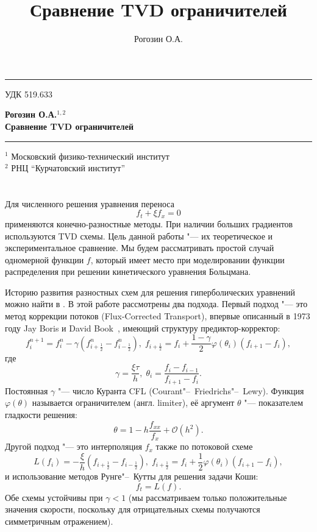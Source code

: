 \documentclass[a4paper,10pt]{article}
\title{Сравнение TVD ограничителей}
\author{Рогозин О.А.}
\date{}
\begin{document}
\begin{center}
	\rule{\linewidth}{0.5mm}
\end{center}
УДК 519.633
\begin{center}
	\large\bfseries Рогозин О.А.\({}^{1,2}\) \\[3mm]
	\huge\bfseries Сравнение TVD ограничителей \\
	\rule{\linewidth}{0.5mm}
\end{center}
	\({}^1\) Московский физико-технический институт \\
	\({}^2\) РНЦ ``Курчатовский институт'' \\

\section*{}
Для численного решения уравнения переноса \[f_t+\xi f_x=0 \] применяются конечно-разностные методы.
При наличии больших градиентов используются TVD схемы. Цель данной работы "--- их теоретическое и экспериментальное сравнение.
Мы будем рассматривать простой случай одномерной функции \(f\), который имеет место при моделировании функции распределения
при решении кинетического уравнения Больцмана.

Историю развития разностных схем для решения гиперболических уравнений можно найти в \cite{vanLeer2006}. В этой работе рассмотрены два подхода.
Первый подход "--- это метод коррекции потоков (Flux-Corrected Transport), впервые описанный в 1973 году Jay Boris и David Book~\cite{Boris1973},
имеющий структуру предиктор-корректор:
\begin{equation}\label{eq:pk}
	f_i^{n+1} = f_i^n - \gamma(f_{i+\frac1{2}}^n-f_{i-\frac1{2}}^n),\; 
	f_{i+\frac1{2}} = f_i + \frac{1-\gamma}{2}\varphi(\theta_i)(f_{i+1} - f_i),
\end{equation}
где
\[ \gamma=\frac{\xi\tau}{h}, \; \theta_i = \frac{f_i - f_{i-1}}{f_{i+1} - f_i}.\]
Постоянная \(\gamma\) "--- число Куранта CFL (Courant"--~Friedrichs"--~Lewy). Функция \(\varphi(\theta)\) называется ограничителем (англ. limiter),
её аргумент \(\theta\) "--- показателем гладкости решения:
\[ \theta = 1-h\frac{f_{xx}}{f_x}+\mathcal{O}(h^2). \]
Другой подход "--- это интерполяция \(f_x\) также по потоковой схеме
\begin{equation}\label{eq:rk1}
	L(f_i) = - \frac{\xi}{h}(f_{i+\frac1{2}}-f_{i-\frac1{2}}),\;
	f_{i+\frac1{2}} = f_i + \frac1{2}\varphi(\theta_i)(f_{i+1} - f_i),
\end{equation}
и использование методов Рунге"--~Кутты для решения задачи Коши:
\begin{equation}\label{eq:rk2}
	f_t = L(f).
\end{equation}
Обе схемы устойчивы при \(\gamma < 1\) (мы рассматриваем только положительные значения скорости,
поскольку для отрицательных схемы получаются симметричным отражением).
\end{document}
